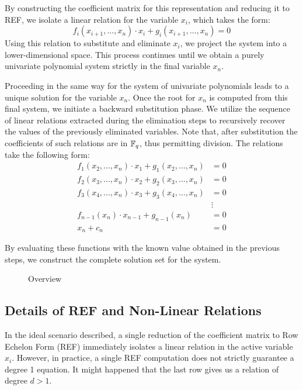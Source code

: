 By constructing the coefficient matrix for this representation and reducing it to REF, we isolate a linear relation for the variable $x_i$, which takes the form:
\begin{equation}
    f_i(x_{i+1}, \dots, x_n)\cdot x_i + g_i(x_{i+1}, \dots, x_n) = 0
    \label{eq:linear_relation_i}
\end{equation}
Using this relation to substitute and eliminate $x_i$, we project the system into a lower-dimensional space. This process continues until we obtain a purely univariate polynomial system strictly in the final variable $x_n$.

Proceeding in the same way for the system of univariate polynomials leads to a unique solution for the variable \(x_n\).
Once the root for $x_n$ is computed from this final system, we initiate a backward substitution phase. We utilize the sequence of linear relations extracted during the elimination steps to recursively recover the values of the previously eliminated variables. Note that, after substitution the coefficients of such relations are in \(\mathbb{F}_q\), thus permitting division. The relations take the following form:
\begin{align*}
    f_1(x_2, \dots, x_n)\cdot x_1 + g_1(x_2, \dots, x_n) &= 0 \\
    f_2(x_3, \dots, x_n)\cdot x_2 + g_2(x_3, \dots, x_n) &= 0 \\
    f_3(x_4, \dots, x_n)\cdot x_3 + g_3(x_4, \dots, x_n) &= 0 \\
    &\vdots \nonumber \\
    f_{n-1}(x_n)\cdot x_{n-1} + g_{n-1}(x_n) &= 0 \\
    x_n + c_n &= 0
    \label{eq:backward_substitution}
\end{align*}

By evaluating these functions with the known value obtained in the previous steps, we construct the complete solution set for the system.


\begin{figure}[h!]
    \centering
    \resizebox{0.3\linewidth}{!}{
        
    }
    \caption{Overview}\label{fig:overview}
\end{figure}


\subsection{Details of REF and Non-Linear Relations}

In the ideal scenario described, a single reduction of the coefficient matrix to Row Echelon Form (REF) immediately isolates a linear relation in the active variable $x_i$. However, in practice, a single REF computation does not strictly guarantee a degree 1 equation. It might happened that the last row gives us a relation of degree $d > 1$.

